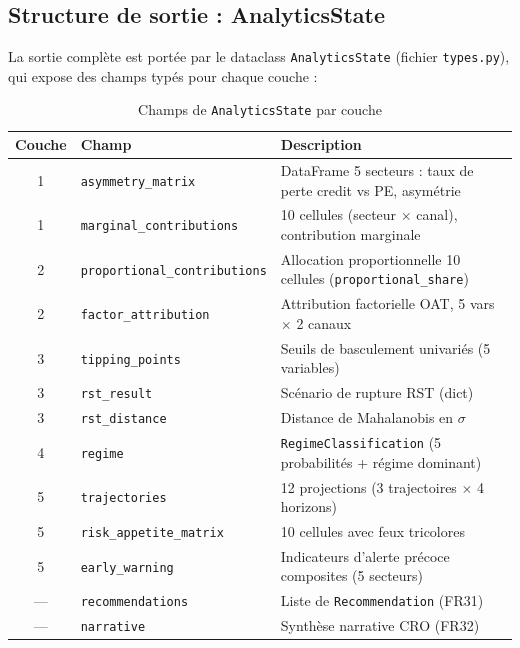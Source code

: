 \documentclass[12pt,a4paper]{article}
\begin{document}
\subsection{Structure de sortie : AnalyticsState}

La sortie compl\`ete est port\'ee par le dataclass \texttt{AnalyticsState}
(fichier \texttt{types.py}), qui expose des champs typ\'es pour chaque couche :

\begin{table}[htbp]
\centering
\caption{Champs de \texttt{AnalyticsState} par couche}
\begin{tabular}{clp{7.5cm}}
\toprule
\textbf{Couche} & \textbf{Champ} & \textbf{Description} \\
\midrule
1 & \texttt{asymmetry\_matrix} & DataFrame 5 secteurs : taux de perte credit vs PE, asym\'etrie \\
1 & \texttt{marginal\_contributions} & 10 cellules (secteur $\times$ canal), contribution marginale \\
2 & \texttt{proportional\_contributions} & Allocation proportionnelle 10 cellules (\texttt{proportional\_share}) \\
2 & \texttt{factor\_attribution} & Attribution factorielle OAT, 5 vars $\times$ 2 canaux \\
3 & \texttt{tipping\_points} & Seuils de basculement univari\'es (5 variables) \\
3 & \texttt{rst\_result} & Sc\'enario de rupture RST (dict) \\
3 & \texttt{rst\_distance} & Distance de Mahalanobis en $\sigma$ \\
4 & \texttt{regime} & \texttt{RegimeClassification} (5 probabilit\'es + r\'egime dominant) \\
5 & \texttt{trajectories} & 12 projections (3 trajectoires $\times$ 4 horizons) \\
5 & \texttt{risk\_appetite\_matrix} & 10 cellules avec feux tricolores \\
5 & \texttt{early\_warning} & Indicateurs d'alerte pr\'ecoce composites (5 secteurs) \\
--- & \texttt{recommendations} & Liste de \texttt{Recommendation} (FR31) \\
--- & \texttt{narrative} & Synth\`ese narrative CRO (FR32) \\
\bottomrule
\end{tabular}
\label{tab:analytics_state}
\end{table}


\newpage
\end{document}
